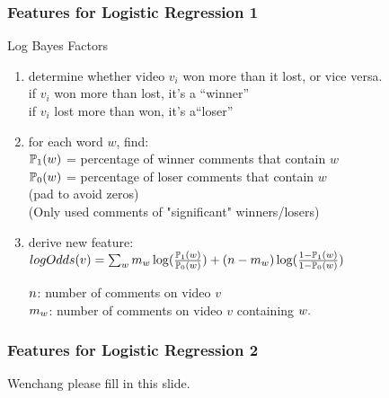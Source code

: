 \documentclass[fleqn]{beamer}
\begin{document}
\begin{frame}
\frametitle{Features for Logistic Regression 1}	
 

      \begin{beamerboxesrounded}{Log Bayes Factors}     
      \begin{enumerate}\vspace{2mm}
      \item determine whether video $v_i$ won more than it lost, or vice versa.\\
               if $v_i$ won more than lost, it's a ``winner''\\
               if $v_i$ lost more than won, it's a``loser''
               \vspace{2mm}
      \item for each word $w$, find: \\
              $\mathbb{P}_1(\mathnormal{w})$ 
             = percentage of winner comments that contain $w$\\
             $\mathbb{P}_0(\mathnormal{w})$ = 
               percentage of loser comments that contain $w$\\
               (pad to avoid zeros)\\
               (Only used comments of "significant" winners/losers)\vspace{2mm}
      \item derive new feature: \\      
$logOdds(v) =\sum_{\mathnormal{w}} \mathnormal{m_w}\log(\frac{\mathbb{P}_1(\mathnormal{w})}{\mathbb{P}_0(\mathnormal{w})}) + (\mathnormal{n-m_w})\log(\frac{1-\mathbb{P}_1(\mathnormal{w})}{1-\mathbb{P}_0(\mathnormal{w})})$\vspace{3mm}

$\mathnormal{n}$: number of comments on video $v$\\
$\mathnormal{m_w}$: number of comments on video $v$ containing $\mathnormal{w}.$  \vspace{3mm}
      \end{enumerate}
    \end{beamerboxesrounded}

\end{frame}

\begin{frame}
\frametitle{Features for Logistic Regression 2}
Wenchang please fill in this slide.

\end{frame}
\end{document}
